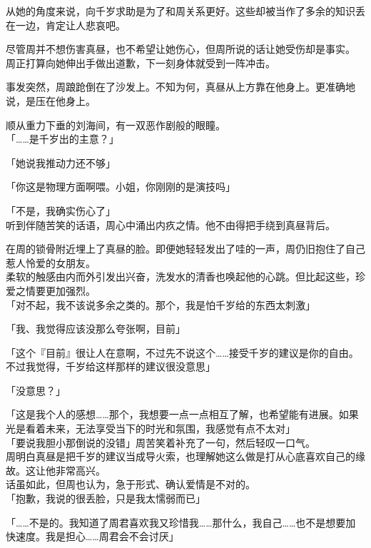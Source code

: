 从她的角度来说，向千岁求助是为了和周关系更好。这些却被当作了多余的知识丢在一边，肯定让人悲哀吧。

尽管周并不想伤害真昼，也不希望让她伤心，但周所说的话让她受伤却是事实。\\

周正打算向她伸出手做出道歉，下一刻身体就受到一阵冲击。

事发突然，周踉跄倒在了沙发上。不知为何，真昼从上方靠在他身上。更准确地说，是压在他身上。

顺从重力下垂的刘海间，有一双恶作剧般的眼瞳。\\

「……是千岁出的主意？」

「她说我推动力还不够」

「你这是物理方面啊喂。小姐，你刚刚的是演技吗」

「不是，我确实伤心了」\\

听到伴随苦笑的话语，周心中涌出内疚之情。他不由得把手绕到真昼背后。

在周的锁骨附近埋上了真昼的脸。即便她轻轻发出了哇的一声，周仍旧抱住了自己惹人怜爱的女朋友。\\

柔软的触感由内而外引发出兴奋，洗发水的清香也唤起他的心跳。但比起这些，珍爱之情要更加强烈。\\

「对不起，我不该说多余之类的。那个，我是怕千岁给的东西太刺激」

「我、我觉得应该没那么夸张啊，目前」

「这个『目前』很让人在意啊，不过先不说这个……接受千岁的建议是你的自由。不过我觉得，千岁给这样那样的建议很没意思」

「没意思？」

「这是我个人的感想……那个，我想要一点一点相互了解，也希望能有进展。如果光是看着未来，无法享受当下的时光和氛围，我感觉有点不太对」\\

「要说我胆小那倒说的没错」周苦笑着补充了一句，然后轻叹一口气。\\

周明白真昼是把千岁的建议当成导火索，也理解她这么做是打从心底喜欢自己的缘故。这让他非常高兴。\\

话虽如此，但周也认为，急于形式、确认爱情是不对的。\\

「抱歉，我说的很丢脸，只是我太懦弱而已」

「……不是的。我知道了周君喜欢我又珍惜我……那什么，我自己……也不是想要加快速度。我是担心……周君会不会讨厌」

